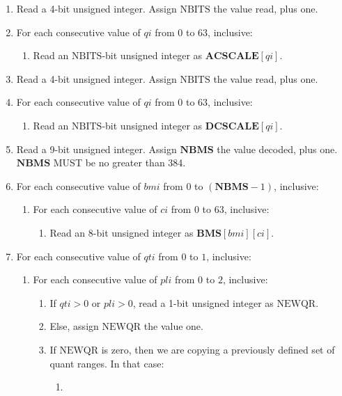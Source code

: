 \documentclass[11pt,letterpaper]{book}
\newcommand{\idx}[1]{{\ensuremath{\mathit{#1}}}}
\newcommand{\qti}{\idx{qti}}
\newcommand{\pli}{\idx{pli}}
\newcommand{\qi}{\idx{qi}}
\newcommand{\ci}{\idx{ci}}
\newcommand{\bmi}{\idx{bmi}}
\newcommand{\bitvar}[1]{\ensuremath{\mathbf{\bm #1}}}
\newcommand{\locvar}[1]{\ensuremath{\mathrm{#1}}}
\numberwithin{equation}{chapter}
\numberwithin{figure}{chapter}
\numberwithin{table}{chapter}
\begin{document}
\begin{enumerate}
\item
Read a 4-bit unsigned integer.
Assign \locvar{NBITS} the value read, plus one.
\item
For each consecutive value of \locvar{\qi} from $0$ to $63$, inclusive:
\begin{enumerate}
\item
Read an \locvar{NBITS}-bit unsigned integer as
 $\bitvar{ACSCALE}[\locvar{\qi}]$.
\end{enumerate}
\item
Read a 4-bit unsigned integer.
Assign \locvar{NBITS} the value read, plus one.
\item
For each consecutive value of \locvar{\qi} from $0$ to $63$, inclusive:
\begin{enumerate}
\item
Read an \locvar{NBITS}-bit unsigned integer as
 $\bitvar{DCSCALE}[\locvar{\qi}]$.
\end{enumerate}
\item
Read a 9-bit unsigned integer.
Assign \bitvar{NBMS} the value decoded, plus one.
\bitvar{NBMS} MUST be no greater than 384.
\item
For each consecutive value of \locvar{\bmi} from $0$ to $(\bitvar{NBMS}-1)$,
 inclusive:
\begin{enumerate}
\item
For each consecutive value of \locvar{\ci} from $0$ to $63$, inclusive:
\begin{enumerate}
\item
Read an 8-bit unsigned integer as $\bitvar{BMS}[\locvar{\bmi}][\locvar{\ci}]$.
\end{enumerate}
\end{enumerate}
\item
For each consecutive value of \locvar{\qti} from $0$ to $1$, inclusive:
\begin{enumerate}
\item
For each consecutive value of \locvar{\pli} from $0$ to $2$, inclusive:
\begin{enumerate}
\item
If $\locvar{\qti}>0$ or $\locvar{\pli}>0$, read a 1-bit unsigned integer as
 \locvar{NEWQR}.
\item
Else, assign \locvar{NEWQR} the value one.
\item
If \locvar{NEWQR} is zero, then we are copying a previously defined set of
 quant ranges.
In that case:
\begin{enumerate}
\item

\end{enumerate}
\end{enumerate}
\end{enumerate}
\end{enumerate}
\end{document}
